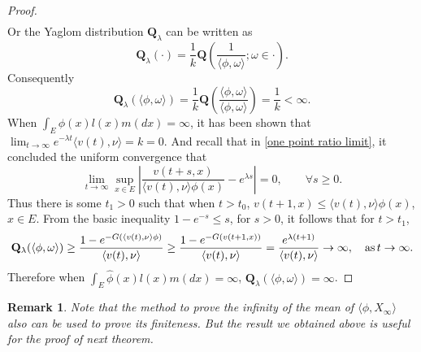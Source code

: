\documentclass[12pt,a4paper]{amsart}
\numberwithin{equation}{section}
\theoremstyle{plain}
\newtheorem{remark}{Remark}
\theoremstyle{definition}
\theoremstyle{remark}
\begin{document}
\begin{proof}
\begin{eqnarray*}
\end{eqnarray*}
Or the Yaglom distribution ${\mathbf Q}_\lambda$ can be written as
\begin{equation}\label{rep: yaglom}
\mathbf Q_\lambda(\cdot)=\dfrac{1}{k}{\mathbf Q}\left(\dfrac{1}{\langle\phi, \omega\rangle }; \omega\in\cdot\right).
\end{equation}
Consequently
\begin{equation}\label{ident: k}
\mathbf Q_\lambda(\langle \phi,\omega\rangle)=\dfrac{1}{k}{\mathbf Q}\left(\dfrac{\langle \phi,\omega\rangle}{\langle \phi,\omega\rangle }\right)=\dfrac{1}{k}<\infty.
\end{equation}
When $\int_E\hat\phi(x)l(x)m(dx)=\infty$, it has been shown that $\lim_{t\to\infty}e^{-\lambda t}\langle v(t),\nu\rangle=k=0$.  And  recall that in \eqref{one point ratio limit}, it concluded the uniform convergence that
\[
\lim_{t\to\infty}\sup_{x\in E}\left|\dfrac{v(t+s,x)}{\langle v(t),\nu\rangle\phi(x)}-e^{\lambda s}\right|=0,\qquad \forall s\geq 0.
\]
Thus there is some $t_1>0$ such that when $t>t_0$, $v(t+1,x)\leq \langle v(t),\nu\rangle\phi(x)$, $x\in E$. From the basic inequality $1-e^{-s}\leq s$, for $s>0$, it follows that for $t>t_1$,
\[
\mathbf Q_\lambda(\langle\phi,\omega\rangle)\geq \dfrac{1-e^{-G(\langle v(t),\nu\rangle\phi)}}{\langle v(t),\nu\rangle}\geq \dfrac{1-e^{-G(v(t+1,x))}}{\langle v(t),\nu\rangle}=\dfrac{e^{\lambda(t+1)}}{\langle v(t),\nu\rangle}\to\infty, \quad {\rm as}\, t\to\infty.
\]
Therefore when   $\int_E\hat\phi(x)l(x)m(dx)=\infty$, $\mathbf Q_\lambda(\langle\phi,\omega\rangle)=\infty$.
\end{proof}
\begin{remark}
Note that the method to prove the infinity of the mean of $\langle\phi,X_\infty\rangle$ also can be used to prove its finiteness.  But the result we obtained  above is useful for the proof of next theorem.
\end{remark}
\end{document}
